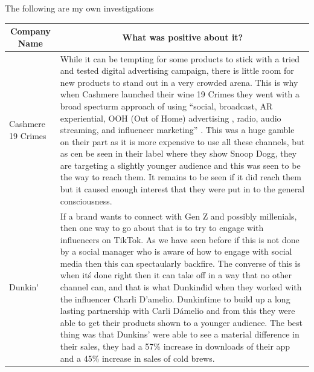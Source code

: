\documentclass{article}
\begin{document}
The following are my own investigations

\begin{table}[htbp]
    \centering
    \begin{tabular}{|p{}|p{}|}
       \hline
       \multicolumn{1}{c}{\bfseries Company Name} & \multicolumn{1}{c}{\bfseries What was positive about it?}  \\
       \hline
	Cashmere 19 Crimes & While it can be tempting for some products to stick with a tried and tested digital advertising campaign, there is little room for new products to stand out in a very crowded arena. This is why when Cashmere launched their wine 19 Crimes they went with a broad specturm approach of using “social, broadcast, AR experiential, OOH (Out of Home) advertising , radio, audio streaming, and influencer marketing” \cite{19Crimes}. This was a huge gamble on their part as it is more expensive to use all these channels, but as cen be seen in their label where they show Snoop Dogg, they are targeting a slightly younger audience and this was seen to be the way to reach them. It remains to be seen if it did reach them but it caused enough interest that they were put in to the general consciousness.  \\
        \hline
	Dunkin\' & If a brand wants to connect with Gen Z and possibly millenials, then one way to go about that is to try to engage with influencers on TikTok. As we have seen before if this is not done by a social manager who is aware of how to engage with social media then this can spectaularly backfire. The converse of this is when it\'s done right then it can take off in a way that no other channel can, and that is what Dunkin\' did when they worked with the influencer Charli D'amelio. \cite{Dunkin} Dunkin\' time to build up a long lasting partnership with Carli D\'amelio and from this they were able to get their products shown to a younger audience. The best thing was that Dunkins\/' were able to see a material difference in their sales, they had a 57\% increase in downloads of their app and a 45\% increase in sales of cold brews. \\
        \hline
    \end{tabular}

\end{table}
\end{document}
